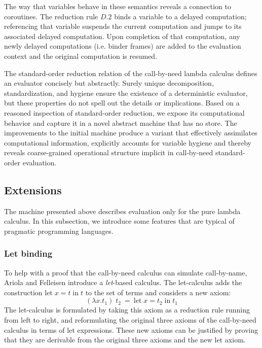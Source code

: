 \documentclass{LMCS}
\theoremstyle{plain}
\theoremstyle{remark}
\begin{document}
The way that variables behave in these semantics reveals a connection to
coroutines.  The reduction rule $D.2$ binds a variable to a delayed
computation; referencing that variable suspends the current computation and
jumps to its associated delayed computation.  Upon completion of that
computation, any newly delayed computations (i.e. binder frames) are added to
the evaluation context and the original computation is resumed.

The standard-order reduction relation of the call-by-need lambda calculus
defines an evaluator concisely but abstractly.  Surely unique decomposition,
standardization, and hygiene ensure the existence of a deterministic evaluator,
but these properties do not spell out the details or implications.  Based on a
reasoned inspection of standard-order reduction, we expose its computational
behavior and capture it in a novel abstract machine that has no store.  The
improvements to the initial machine produce a variant that effectively
assimilates computational information, explicitly accounts for variable hygiene
and thereby reveals coarse-grained operational structure implicit in
call-by-need standard-order evaluation.

\subsection{Extensions}

The machine presented above describes evaluation only for the pure lambda
calculus.  In this subsection, we introduce some features that are typical of
pragmatic programming languages.

\subsubsection{Let binding}

To help with a proof that the call-by-need calculus can simulate call-by-name,
Ariola and Felleisen introduce a \emph{let}-based calculus. The let-calculus
adds the construction $\mathrm{let}\;x=t\;\mathrm{in}\;t$ to the set of terms
and considers a new axiom:
\begin{displaymath}
      (\lambda x.t_1)\;t_2 \:= \: \mathrm{let}\; x=t_2\; \mathrm{in}\; t_1
\end{displaymath}
The let-calculus is formulated by taking this axiom as a reduction
rule running from left to right, and reformulating the original three axioms of
the call-by-need calculus in terms of $\mathrm{let}$ expressions.  These new
axioms can be justified by proving that they are derivable from the original
three axioms and the new $\mathrm{let}$ axiom.
\end{document}
